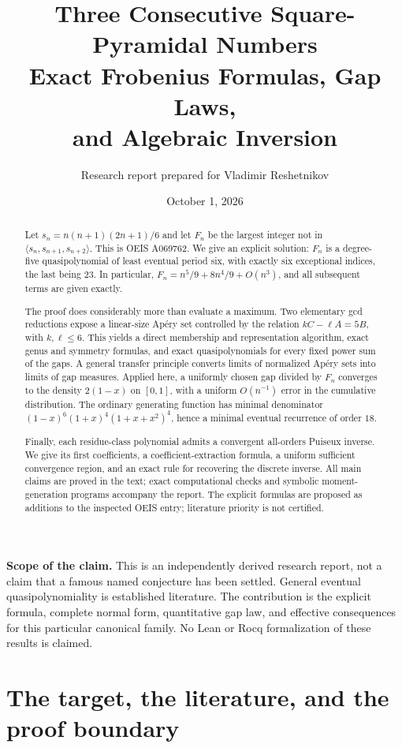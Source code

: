 \documentclass[11pt,a4paper]{article}
\title{\vspace{-1.0cm}\color{inkblue}\LARGE\bfseries
Three Consecutive Square-Pyramidal Numbers\\[5pt]
\Large Exact Frobenius Formulas, Gap Laws,\\and Algebraic Inversion}
\author{\normalsize Research report prepared for Vladimir Reshetnikov}
\date{October 1, 2026}
\numberwithin{equation}{section}
\theoremstyle{definition}
\begin{document}
\maketitle
\thispagestyle{empty}
\begin{abstract}
Let $s_n=n(n+1)(2n+1)/6$ and let $F_n$ be the largest integer not in
$\langle s_n,s_{n+1},s_{n+2}\rangle$. This is OEIS A069762. We give an explicit
solution: $F_n$ is a degree-five quasipolynomial of least eventual period six,
with exactly six exceptional indices, the last being $23$. In particular,
$F_n=n^5/9+8n^4/9+O(n^3)$, and all subsequent terms are given exactly.

The proof does considerably more than evaluate a maximum. Two elementary gcd
reductions expose a linear-size Ap\'ery set controlled by the relation
$kC-\ell A=5B$, with $k,\ell\leq6$. This yields a direct membership and
representation algorithm, exact genus and symmetry formulas, and exact
quasipolynomials for every fixed power sum of the gaps. A general transfer
principle converts limits of normalized Ap\'ery sets into limits of gap
measures. Applied here, a uniformly chosen gap divided by $F_n$ converges to
the density $2(1-x)$ on $[0,1]$, with a uniform $O(n^{-1})$ error in the
cumulative distribution. The ordinary generating function has minimal
denominator $(1-x)^6(1+x)^4(1+x+x^2)^4$, hence a minimal eventual recurrence
of order $18$.

Finally, each residue-class polynomial admits a convergent all-orders
Puiseux inverse. We give its first coefficients, a coefficient-extraction
formula, a uniform sufficient convergence region, and an exact rule for
recovering the discrete inverse. All main claims are proved in the text;
exact computational checks and symbolic moment-generation programs accompany
the report. The explicit formulas are proposed as additions to the inspected
OEIS entry; literature priority is not certified.
\end{abstract}
\vfill
\noindent\small\textbf{Scope of the claim.} This is an independently derived research
report, not a claim that a famous named conjecture has been settled. General
eventual quasipolynomiality is established literature. The contribution is the
explicit formula, complete normal form, quantitative gap law, and effective
consequences for this particular canonical family. No Lean or Rocq
formalization of these results is claimed.
\clearpage
\tableofcontents
\clearpage

\section{The target, the literature, and the proof boundary}
\end{document}
